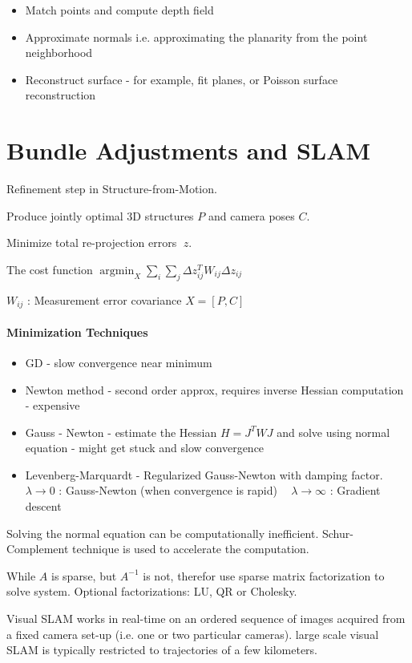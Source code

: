 \begin{enumerate}
\begin{itemize}
\item Match points and compute depth field
\item Approximate normals i.e. approximating the planarity from the point neighborhood
\item  Reconstruct surface - for example, fit planes, or Poisson surface reconstruction
\end{itemize}

\section{Bundle Adjustments and SLAM}

Refinement step in Structure-from-Motion.

Produce jointly optimal 3D structures $P$ and camera poses $C$.

Minimize total re-projection errors 􏰅$z$.

The cost function $\operatorname{argmin}_X \sum_i \sum_j \Delta z_{ij}^T W_{ij} \Delta z_{ij} $

$W_{ij}$ : Measurement error covariance
$X = [P,C]$


\paragraph{Minimization Techniques}

\begin{itemize}
\item GD - slow convergence near minimum
\item Newton method - second order approx, requires inverse Hessian computation - expensive
\item Gauss - Newton - estimate the Hessian $H = J^TWJ$ and solve using normal equation - might get stuck and slow convergence 
\item Levenberg-Marquardt - Regularized Gauss-Newton with damping factor. 
􏰍 􏰎$ \lambda \to 0$ : Gauss-Newton (when convergence is rapid)
􏰍 􏰎$ \lambda \to \infty$ : Gradient descent
\end{itemize}

Solving the normal equation can be computationally inefficient. Schur-Complement technique is used to accelerate the computation. 

While $A$ is sparse, but $A^{-1}$ is not, therefor use sparse matrix factorization to solve system. 
Optional factorizations: LU, QR or Cholesky.

Visual SLAM works in real-time on an ordered sequence of images acquired from a fixed camera set-up (i.e. one or two particular cameras). 
large scale visual SLAM is typically restricted to trajectories of a few kilometers.


\end{enumerate}
